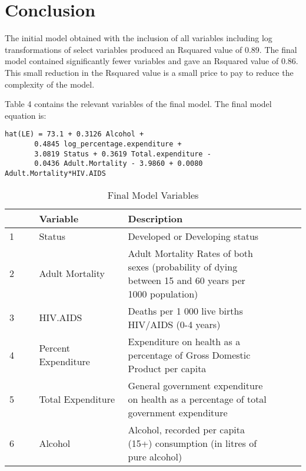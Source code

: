 
\section{Conclusion}
\label{sec:conclusion}

The initial model obtained with the inclusion of all variables including log transformations of select variables produced an Rsquared value of 0.89. The final model contained significantly fewer variables and gave an Rsquared value of 0.86. This small reduction in the Rsquared value is a small price to pay to reduce the complexity of the model.

Table 4 contains the relevant variables of the final model. The final model equation is:

\begin{verbatim}
hat(LE) = 73.1 + 0.3126 Alcohol + 
       0.4845 log_percentage.expenditure + 
       3.0819 Status + 0.3619 Total.expenditure - 
       0.0436 Adult.Mortality - 3.9860 + 0.0080 Adult.Mortality*HIV.AIDS
\end{verbatim}



\begin{table}[ht]
\centering
\begin{tabular}{@{}p{0.1\linewidth}  p{0.3\linewidth}p{0.5\linewidth}p{0.1\linewidth}@{}}
  \toprule
 & Variable & Description \\ 
  \midrule

1 & Status & Developed or Developing status \\ 
  2 & Adult Mortality &  Adult Mortality Rates of both sexes (probability of dying between 15 and 60 years per 1000 population) \\ 
  3 & HIV.AIDS &  Deaths per 1 000 live births HIV/AIDS (0-4 years) \\ 
  4 & Percent Expenditure &  Expenditure on health as a percentage of Gross Domestic Product per capita\\ 
  5 & Total Expenditure &  General government expenditure on health as a percentage of total government expenditure \\ 
 6 & Alcohol &  Alcohol, recorded per capita (15+) consumption (in litres of pure alcohol)\\

\bottomrule
\end{tabular}
\caption{Final Model Variables}
\label{tab:missing}
\end{table}

